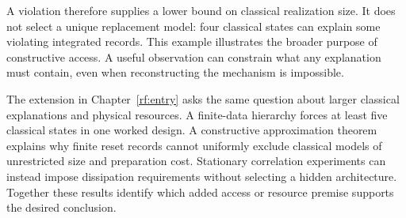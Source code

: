 A violation therefore supplies a lower bound on classical realization size.
It does not select a unique replacement model: four classical states can explain
some violating integrated records. This example illustrates the broader
purpose of constructive access. A useful observation can constrain what any
explanation must contain, even when reconstructing the mechanism is impossible.

The extension in Chapter~\ref{rf:entry} asks the same question about larger
classical explanations and physical resources. A finite-data hierarchy forces
at least five classical states in one worked design. A constructive approximation
theorem explains why finite reset records cannot uniformly exclude classical
models of unrestricted size and preparation cost. Stationary correlation
experiments can instead impose dissipation requirements without selecting a
hidden architecture. Together these results identify which added access or
resource premise supports the desired conclusion.


